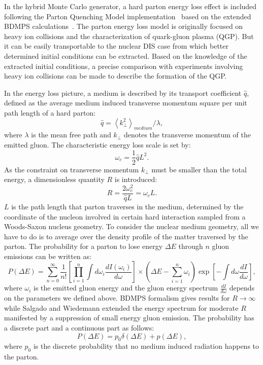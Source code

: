 In the hybrid Monte Carlo generator, a hard parton energy loss effect is
included following the Parton Quenching Model
implementation~\cite{Dupre:2011afa} based on the extended BDMPS
calculations~\cite{Salgado:2003gb}. The parton energy loss model is originally
focused on heavy ion collisions and the characterization of quark-gluon plasma
(QGP). But it can be easily transportable to the nuclear DIS case from which better
determined initial conditions can be extracted. Based on the knowledge
of the extracted initial conditions, a precise comparison with experiments
involving heavy ion collisions can be made to describe the formation of the QGP.

In the energy loss picture, a medium is described by its transport coefficient $\hat{q}$,
defined as the average medium induced transverse momentum square per unit path
length of a hard parton:
\begin{equation}
\hat{q} = \left\langle k^{2}_{\perp}\right\rangle _{medium}/\lambda,
\end{equation}
where $\lambda$ is the mean free path and $k_{\perp}$ denotes the transverse
momentum of the emitted gluon. The characteristic energy loss scale is set by:
\begin{equation}
\omega_{c} = \frac{1}{2}\hat{q}L^{2}.
\end{equation}
As the constraint on transverse momentum $k_{\perp}$ must be smaller than the
total energy, a dimensionless quantity $R$ is introduced:
\begin{equation}
R = \frac{2\omega^{2}_{c}}{\hat{q}L} = \omega_{c}L.
\end{equation}
$L$ is the path length that parton traverses in the medium, determined by the
coordinate of the nucleon involved in certain hard interaction sampled from
a Woods-Saxon nucleus geometry. To consider the nuclear medium geometry, all we
have to do is to average over the density profile of the matter traversed by the
parton. The probability for a parton to lose energy $\Delta E$ through $n$ gluon emissions can be
written as:
\begin{equation}
P(\Delta E)=\sum^{\infty}_{n=0}\frac{1}{n!}[\prod^{n}_{i=1}\int d\omega_{i}\frac{dI(\omega_{i})}{d\omega}]
\times(\Delta E-\sum^{n}_{i=1}\omega_{i})\exp[-\int d\omega\frac{dI}{d\omega}],
\end{equation}
where $\omega_{i}$ is the emitted gluon energy and the gluon energy spectrum
$\frac{dI}{d\omega}$ depends on the parameters we defined above. BDMPS formalism
gives results for $R\rightarrow \infty$ while Salgado and Wiedemann extended the
energy spectrum for moderate $R$ manifested by a suppression of small energy
gluon emission. The probability has a discrete part and a continuous part as
follows:
\begin{equation}
P(\Delta E) = p_{0}\delta(\Delta E) + p(\Delta E),
\end{equation}
where $p_{0}$ is the discrete probability that no medium induced radiation
happens to the parton.

